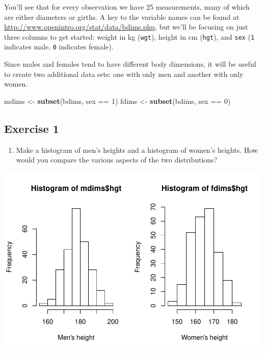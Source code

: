 \documentclass[]{article}
\newenvironment{Shaded}{\begin{snugshade}}{\end{snugshade}}
\newcommand{\KeywordTok}[1]{\textcolor[rgb]{0.13,0.29,0.53}{\textbf{{#1}}}}
\newcommand{\DataTypeTok}[1]{\textcolor[rgb]{0.13,0.29,0.53}{{#1}}}
\newcommand{\DecValTok}[1]{\textcolor[rgb]{0.00,0.00,0.81}{{#1}}}
\newcommand{\StringTok}[1]{\textcolor[rgb]{0.31,0.60,0.02}{{#1}}}
\newcommand{\NormalTok}[1]{{#1}}
\providecommand{\tightlist}{%
  \setlength{\itemsep}{0pt}\setlength{\parskip}{0pt}}
\begin{document}
You'll see that for every observation we have 25 measurements, many of
which are either diameters or girths. A key to the variable names can be
found at \url{http://www.openintro.org/stat/data/bdims.php}, but we'll
be focusing on just three columns to get started: weight in kg
(\texttt{wgt}), height in cm (\texttt{hgt}), and \texttt{sex}
(\texttt{1} indicates male, \texttt{0} indicates female).

Since males and females tend to have different body dimensions, it will
be useful to create two additional data sets: one with only men and
another with only women.

\begin{Shaded}
\begin{Highlighting}[]
\NormalTok{mdims <-}\StringTok{ }\KeywordTok{subset}\NormalTok{(bdims, sex ==}\StringTok{ }\DecValTok{1}\NormalTok{)}
\NormalTok{fdims <-}\StringTok{ }\KeywordTok{subset}\NormalTok{(bdims, sex ==}\StringTok{ }\DecValTok{0}\NormalTok{)}
\end{Highlighting}
\end{Shaded}

\subsection{Exercise 1}\label{exercise-1}

\begin{enumerate}
\def\labelenumi{\arabic{enumi}.}
\tightlist
\item
  Make a histogram of men's heights and a histogram of women's heights.
  How would you compare the various aspects of the two distributions?
\end{enumerate}

\begin{Shaded}
\end{Shaded}

\includegraphics{Lab_3_files/figure-latex/unnamed-chunk-1-1.pdf}
\end{document}
